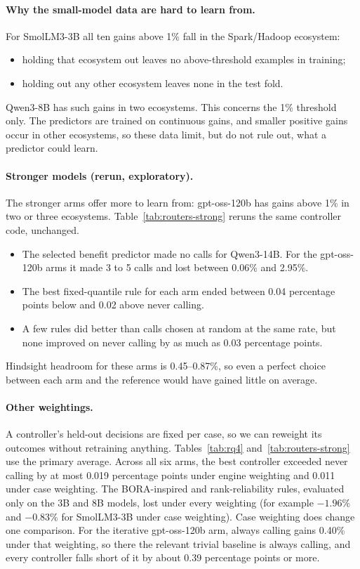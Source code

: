 \paragraph{Why the small-model data are hard to learn from.} For SmolLM3-3B all ten gains above 1\% fall in the Spark/Hadoop ecosystem:
\begin{itemize}
  \item holding that ecosystem out leaves no above-threshold examples in training;
  \item holding out any other ecosystem leaves none in the test fold.
\end{itemize}
Qwen3-8B has such gains in two ecosystems. This concerns the 1\% threshold only. The predictors are trained on continuous gains, and smaller positive gains occur in other ecosystems, so these data limit, but do not rule out, what a predictor could learn.

\paragraph{Stronger models (rerun, exploratory).} The stronger arms offer more to learn from: gpt-oss-120b has gains above 1\% in two or three ecosystems. Table~\ref{tab:routers-strong} reruns the same controller code, unchanged.
\begin{itemize}
  \item The selected benefit predictor made no calls for Qwen3-14B. For the gpt-oss-120b arms it made 3 to 5 calls and lost between 0.06\% and 2.95\%.
  \item The best fixed-quantile rule for each arm ended between 0.04 percentage points below and 0.02 above never calling.
  \item A few rules did better than calls chosen at random at the same rate, but none improved on never calling by as much as 0.03 percentage points.
\end{itemize}
Hindsight headroom for these arms is 0.45--0.87\%, so even a perfect choice between each arm and the reference would have gained little on average.

\paragraph{Other weightings.} A controller's held-out decisions are fixed per case, so we can reweight its outcomes without retraining anything. Tables~\ref{tab:rq4} and~\ref{tab:routers-strong} use the primary average. Across all six arms, the best controller exceeded never calling by at most 0.019 percentage points under engine weighting and 0.011 under case weighting. The BORA-inspired and rank-reliability rules, evaluated only on the 3B and 8B models, lost under every weighting (for example $-1.96\%$ and $-0.83\%$ for SmolLM3-3B under case weighting). Case weighting does change one comparison. For the iterative gpt-oss-120b arm, always calling gains 0.40\% under that weighting, so there the relevant trivial baseline is always calling, and every controller falls short of it by about 0.39 percentage points or more.

